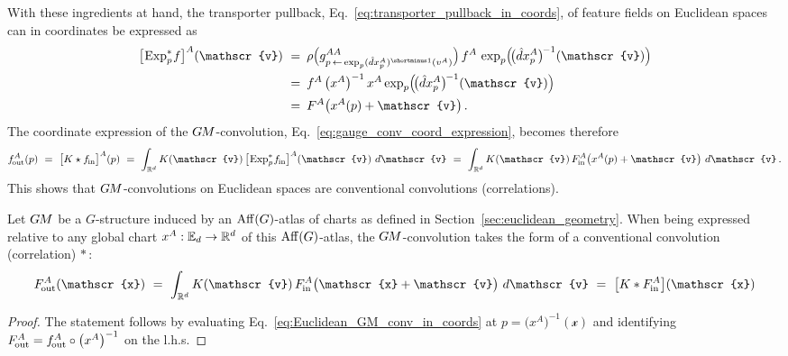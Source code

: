 With these ingredients at hand, the transporter pullback, Eq.~\eqref{eq:transporter_pullback_in_coords}, of feature fields on Euclidean spaces can in coordinates be expressed as
\begin{align}\label{eq:transporter_pullback_Euclidean}
    \big[\mkern-2mu \Expspf \big]^A (\mathscr{v})
    \ =&\,\ \rho\pig( g^{AA}_{p \,\leftarrow\, \exp_p (\hat{d}x_p^A)^{\shortminus1}(v^A)} \pig) \,
          f^A\, \exp_p \!\pig(\! \big(\hat{d}x_p^A\big)^{\mkern-2mu-1}(\mathscr{v}) \pig) \notag \\
    \ =&\,\ f^A\, \big(x^A\big)^{-1}\, x^A \exp_p \!\pig(\! \big(\hat{d}x_p^A\big)^{\mkern-2mu-1}(\mathscr{v}) \pig) \notag \\
    \ =&\,\ F^A \big( x^A(p) + \mathscr{v} \big) \,.
\end{align}
The coordinate expression of the $G\mkern-1.4muM$-convolution, Eq.~\eqref{eq:gauge_conv_coord_expression}, becomes therefore
\begin{align}\label{eq:Euclidean_GM_conv_in_coords}
    \fout^A(p)
    \ =\ \big[K \star \fin \big]^A (p)
    \ =\ \int_{\R^d} K(\mathscr{v})\, \big[\mkern-2mu \Expspfin\big]^A (\mathscr{v})\ d\mathscr{v}
    \ =\ \int_{\R^d} K(\mathscr{v})\, \Fin^A\big( x^A(p) + \mathscr{v} \big)\ d\mathscr{v} \,.
\end{align}
This shows that $G\mkern-1.4muM$-convolutions on Euclidean spaces are conventional convolutions (correlations).
\begin{thm}
\label{thm:Euclidean_GM_conv_is_conventional_conv}
    Let $G\mkern-1.4muM$ be a $G$-structure induced by an $\operatorname{Aff}(G)$-atlas of charts as defined in Section~\ref{sec:euclidean_geometry}.
    When being expressed relative to any global chart $x^A: \mathbb{E}_d \to \mathbb{R}^d$ of this $\operatorname{Aff}(G)$-atlas, the $G\mkern-1.4muM$-convolution takes the form of a conventional convolution (correlation) $*$\,:
    \begin{align}
        \Fout^A(\mathscr{x})
        \ =\ \int_{\R^d} K(\mathscr{v})\, \Fin^A\big( \mathscr{x} + \mathscr{v} \big)\ d\mathscr{v}
        \ =\ \big[ K * \Fin^A \big] (\mathscr{x})
    \end{align}
\end{thm}
\begin{proof}
    The statement follows by evaluating Eq.~\eqref{eq:Euclidean_GM_conv_in_coords} at $p = \big(x^A\big)^{-1}(\mathscr{x})$ and identifying $F_\textup{\:\!\!out}^A = f_\textup{\:\!\!out}^A \circ \big(x^A\big)^{-1}$ on the l.h.s.
\end{proof}



